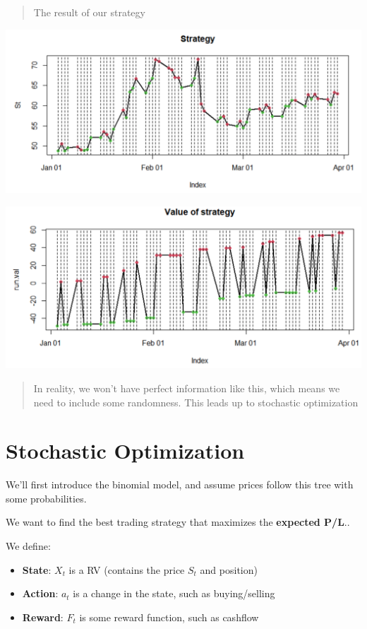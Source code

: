 \documentclass[
  oneside]{book}
\providecommand{\tightlist}{%
  \setlength{\itemsep}{0pt}\setlength{\parskip}{0pt}}
\begin{document}
\begin{quote}
The result of our strategy
\end{quote}

\includegraphics{Notes/Obsidian-Attachments/13-Optimization-in-Finance-1.png}

\includegraphics{Notes/Obsidian-Attachments/13-Optimization-in-Finance-2.png}

\begin{quote}
In reality, we won't have perfect information like this, which means we need to include some randomness. This leads up to stochastic optimization
\end{quote}

\hypertarget{stochastic-optimization}{%
\section{Stochastic Optimization}\label{stochastic-optimization}}

We'll first introduce the binomial model, and assume prices follow this tree with some probabilities.

We want to find the best trading strategy that maximizes the \textbf{expected P/L}..

We define:

\begin{itemize}
\tightlist
\item
  \textbf{State}: \(X_{t}\) is a RV (contains the price \(S_{t}\) and position)
\item
  \textbf{Action}: \(a_{t}\) is a change in the state, such as buying/selling
\item
  \textbf{Reward}: \(F_{t}\) is some reward function, such as cashflow
\end{itemize}
\end{document}
